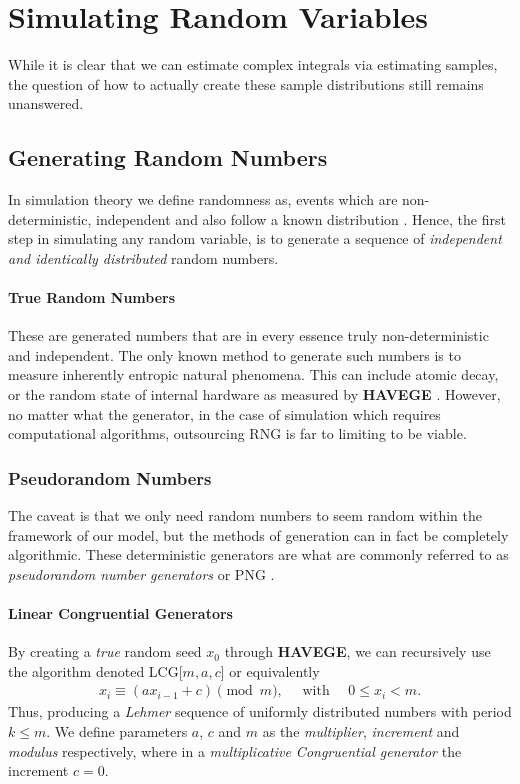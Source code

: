 \documentclass{article}
\begin{document}
\section{Simulating Random Variables}

While it is clear that we can estimate complex integrals via estimating samples, 
the question of how to actually create these sample distributions still remains 
unanswered.

\subsection{Generating Random Numbers}

In simulation theory we define randomness as, events which are non-deterministic, independent 
and also follow a known distribution \cite{shiryaev2016probability}. 
Hence, the first step in simulating any random variable, is to generate a sequence of 
\textit{independent and identically distributed} random numbers.
\paragraph{True Random Numbers}
These are generated numbers that are in every essence truly non-deterministic and independent.
The only known method to generate such numbers is to measure inherently entropic natural phenomena.
This can include atomic decay, or the random state of internal hardware as measured by 
\textbf{HAVEGE} \cite{gentle2003random}.
However, no matter what the generator, in the case of simulation which requires computational algorithms,
outsourcing RNG is far to limiting to be viable. 

\subsubsection{Pseudorandom Numbers}
The caveat is that we only need random numbers to seem random within the framework of our model,
but the methods of generation can in fact be completely algorithmic. These deterministic generators 
are what are commonly referred to as \textit{pseudorandom number generators} or PNG \cite{alma9954732790001381}. 

\paragraph{Linear Congruential Generators}
By creating a \textit{true} random seed $x_0$ through \textbf{HAVEGE},
we can recursively use the algorithm denoted LCG[$m,a,c$] or equivalently
\begin{align} 
    \label{eq: Linear Congruential Generator}
    x_{i} \equiv (ax_{i-1} + c) \pmod{m},\quad\text{    with    }\quad0\leq x_{i}<m.
\end{align}
Thus, producing a \textit{Lehmer} sequence of uniformly distributed numbers with period $k \leq m$. 
We define parameters $a$, $c$ and $m$ as the \textit{multiplier}, \textit{increment} 
and \textit{modulus} respectively,
where in a \textit{multiplicative Congruential generator} the increment $c=0$. \cite{alma9954732790001381}\cite{gentle2003random}
\end{document}
